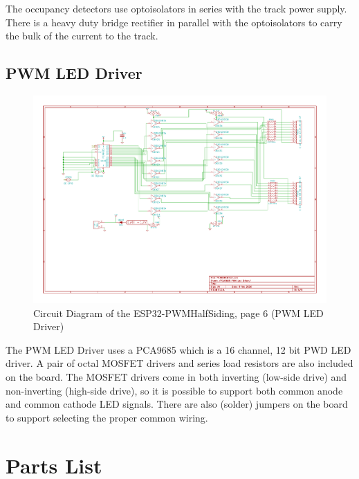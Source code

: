 The occupancy detectors use optoisolators in series with the track power 
supply.  There is a heavy duty bridge rectifier in parallel with the 
optoisolators to carry the bulk of the current to the track.

\clearpage
\subsection{PWM LED Driver}
\begin{figure}[hbpt]\begin{centering}%
\includegraphics[width=5in]{ESP32-PWMHalfSiding-6.pdf}
\caption{Circuit Diagram of the ESP32-PWMHalfSiding, page 6 (PWM LED Driver)}
\end{centering}\end{figure}

The PWM LED Driver uses a PCA9685 which is a 16 channel, 12 bit PWD LED 
driver.  A pair of octal MOSFET drivers and series load resistors are also 
included on the board.  The MOSFET drivers come in both inverting (low-side 
drive) and non-inverting (high-side drive), so it is possible to support both 
common anode and common cathode LED signals.  There are also (solder) jumpers 
on the board to support selecting the proper common wiring.

\clearpage
\section{Parts List}

